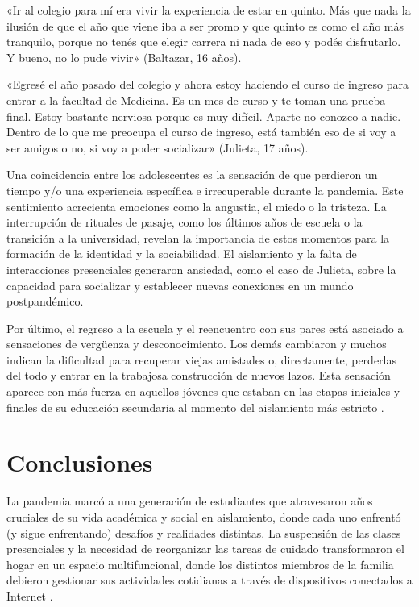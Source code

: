 \begin{refsection}
\begin{gbcita}
«Ir al colegio para mí era vivir la experiencia de estar en quinto. Más que nada la ilusión de que el año que viene iba a ser promo y que quinto es como el año más tranquilo, porque no tenés que elegir carrera ni nada de eso y podés disfrutarlo. Y bueno, no lo pude vivir» (Baltazar, 16 años).

«Egresé el año pasado del colegio y ahora estoy haciendo el curso de ingreso para entrar a la facultad de Medicina. Es un mes de curso y te toman una prueba final. Estoy bastante nerviosa porque es muy difícil. Aparte no conozco a nadie. Dentro de lo que me preocupa el curso de ingreso, está también eso de si voy a ser amigos o no, si voy a poder socializar» (Julieta, 17 años).

\end{gbcita}

Una coincidencia entre los adolescentes es la sensación de que perdieron un tiempo y/o una experiencia específica e irrecuperable durante la pandemia. Este sentimiento acrecienta emociones como la angustia, el miedo o la tristeza. La interrupción de rituales de pasaje, como los últimos años de escuela o la transición a la universidad, revelan la importancia de estos momentos para la formación de la identidad y la sociabilidad. El aislamiento y la falta de interacciones presenciales generaron ansiedad, como el caso de Julieta, sobre la capacidad para socializar y establecer nuevas conexiones en un mundo postpandémico.

Por último, el regreso a la escuela y el reencuentro con sus pares está asociado a sensaciones de vergüenza y desconocimiento. Los demás cambiaron y muchos indican la dificultad para recuperar viejas amistades o, directamente, perderlas del todo y entrar en la trabajosa construcción de nuevos lazos. Esta sensación aparece con más fuerza en aquellos jóvenes que estaban en las etapas iniciales y finales de su educación secundaria al momento del aislamiento más estricto \protect\parencite{4233-MOGUILLANSKY2022}.


\section[Conclusiones]{Conclusiones}
\label{cap-26.conclusiones}
La pandemia marcó a una generación de estudiantes que atravesaron años cruciales de su vida académica y social en aislamiento, donde cada uno enfrentó (y sigue enfrentando) desafíos y realidades distintas. La suspensión de las clases presenciales y la necesidad de reorganizar las tareas de cuidado transformaron el hogar en un espacio multifuncional, donde los distintos miembros de la familia debieron gestionar sus actividades cotidianas a través de dispositivos conectados a Internet \protect\parencite{4189-ACEVEDO2021,4192-ANDERETESCHWAL2020,4182-HEREDIA2022}.


\end{refsection}
